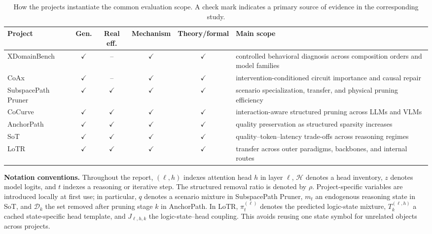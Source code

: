 \documentclass[12pt,a4paper]{article}
\newcommand{\method}[1]{{\sffamily\bfseries\color{MethodBlue}#1}}
\newcommand{\XDB}{\method{XDomainBench}}
\newcommand{\SubspacePath}{\method{SubspacePath Pruner}}
\newcommand{\CoCurve}{\method{CoCurve}}
\newcommand{\AnchorPath}{\method{AnchorPath}}
\newcommand{\CoAx}{\method{CoAx}}
\newcommand{\SoT}{\method{SoT}}
\newcommand{\LoTR}{\method{LoTR}}
\newcommand{\EtoE}{\method{E2E-Merge}}
\def\method#1{#1}\def\XDB{XDomainBench}\def\SubspacePath{SubspacePath Pruner}%
\def\CoCurve{CoCurve}\def\AnchorPath{AnchorPath}\def\CoAx{CoAx}%
\def\SoT{SoT}\def\LoTR{LoTR}\def\EtoE{E2E-Merge}%
\begin{document}
\begin{table}[H]
\centering\singlespacing\scriptsize
\caption{How the projects instantiate the common evaluation scope. A check mark indicates a primary source of evidence in the corresponding study.}
\label{tab:scope-map}
\setlength{\tabcolsep}{3.2pt}
\begin{tabularx}{\textwidth}{@{}p{2.9cm} c c c c X@{}}
\toprule
\textbf{Project} & \textbf{Gen.} & \textbf{Real eff.} & \textbf{Mechanism} & \textbf{Theory/formal} & \textbf{Main scope} \\
\midrule
\XDB{} & $\checkmark$ & -- & $\checkmark$ & $\checkmark$ & controlled behavioral diagnosis across composition orders and model families \\
\CoAx{} & $\checkmark$ & -- & $\checkmark$ & $\checkmark$ & intervention-conditioned circuit importance and causal repair \\
\SubspacePath{} & $\checkmark$ & $\checkmark$ & $\checkmark$ & $\checkmark$ & scenario specialization, transfer, and physical pruning efficiency \\
\CoCurve{} & $\checkmark$ & $\checkmark$ & $\checkmark$ & $\checkmark$ & interaction-aware structured pruning across LLMs and VLMs \\
\AnchorPath{} & $\checkmark$ & $\checkmark$ & $\checkmark$ & $\checkmark$ & quality preservation as structured sparsity increases \\
\SoT{} & $\checkmark$ & $\checkmark$ & $\checkmark$ & $\checkmark$ & quality--token--latency trade-offs across reasoning regimes \\
\LoTR{} & $\checkmark$ & $\checkmark$ & $\checkmark$ & $\checkmark$ & transfer across outer paradigms, backbones, and internal routes \\
\bottomrule
\end{tabularx}
\end{table}

\begin{evidencebox}
\textbf{Notation conventions.} Throughout the report, $(\ell,h)$ indexes attention head $h$ in layer $\ell$, $\mathcal H$ denotes a head inventory, $z$ denotes model logits, and $t$ indexes a reasoning or iterative step. The structured removal ratio is denoted by $\rho$. Project-specific variables are introduced locally at first use; in particular, $q$ denotes a scenario mixture in \SubspacePath{}, $m_t$ an endogenous reasoning state in \SoT{}, and $\mathcal D_k$ the set removed after pruning stage $k$ in \AnchorPath{}. In \LoTR{}, $\pi_t^{(\ell)}$ denotes the predicted logic-state mixture, $T_k^{(\ell,h)}$ a cached state-specific head template, and $J_{\ell,h,k}$ the logic-state--head coupling. This avoids reusing one state symbol for unrelated objects across projects.
\end{evidencebox}
\end{document}
